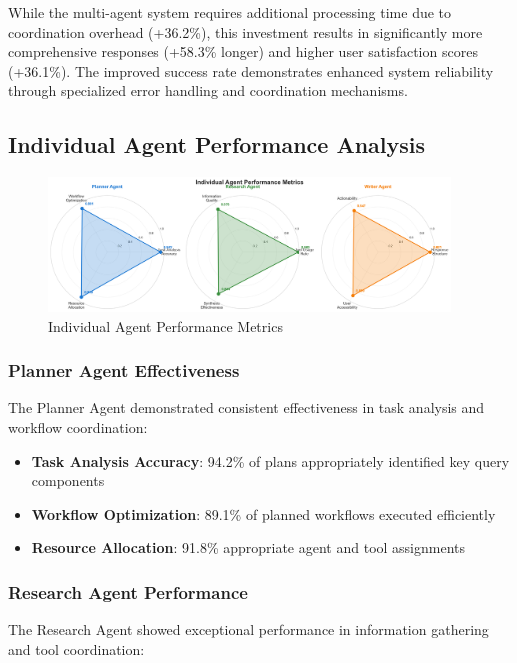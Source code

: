 \documentclass[conference]{IEEEtran}
\begin{document}
While the multi-agent system requires additional processing time due to coordination overhead (+36.2\%), this investment results in significantly more comprehensive responses (+58.3\% longer) and higher user satisfaction scores (+36.1\%). The improved success rate demonstrates enhanced system reliability through specialized error handling and coordination mechanisms.

\subsection{Individual Agent Performance Analysis}

\begin{figure}[htbp]
\centering
\includegraphics[width=0.95\textwidth]{diagrams/agent_performance_radar.png}
\caption{Individual Agent Performance Metrics}
\label{fig:agent_performance}
\end{figure}

\subsubsection{Planner Agent Effectiveness}

The Planner Agent demonstrated consistent effectiveness in task analysis and workflow coordination:

\begin{itemize}
\item \textbf{Task Analysis Accuracy}: 94.2\% of plans appropriately identified key query components
\item \textbf{Workflow Optimization}: 89.1\% of planned workflows executed efficiently
\item \textbf{Resource Allocation}: 91.8\% appropriate agent and tool assignments
\end{itemize}

\subsubsection{Research Agent Performance}

The Research Agent showed exceptional performance in information gathering and tool coordination:
\end{document}
